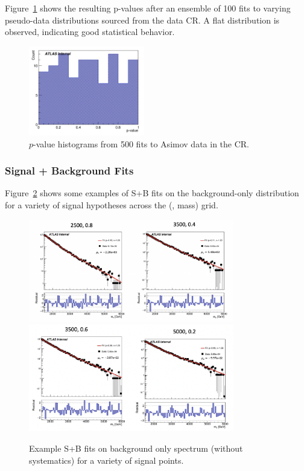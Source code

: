 Figure~\ref{fig:asimov_hist} shows the resulting p-values after an ensemble of 100 fits to varying pseudo-data distributions sourced from the data CR. 
A flat distribution is observed, indicating good statistical behavior.
\begin{figure}[!htbp]
\centering
   \includegraphics[width=0.45\textwidth]{figures/stats/asimov_cr_hist}
    \caption{$p$-value histograms from 500 fits to Asimov data in the CR. %
    \label{fig:asimov_hist}}
\end{figure}




\subsubsection{Signal + Background Fits}
\label{subsec:fit_splusb}

Figure~\ref{fig:splusb_ex} shows some examples of S+B fits on the background-only distribution for a variety of signal hypotheses across the (\rinv, mass) grid.
\begin{figure}[!htbp]
\centering
   \includegraphics[width=0.8\textwidth]{figures/stats/splusb_ex1}
   \includegraphics[width=0.8\textwidth]{figures/stats/splusb_ex2}
    \caption{Example S+B fits on background only spectrum (without systematics) for a variety of signal points.
    \label{fig:splusb_ex}}
\end{figure}


